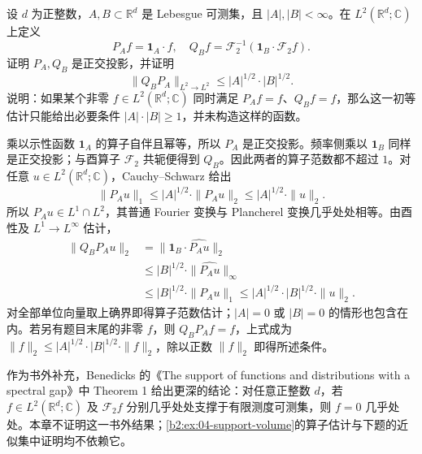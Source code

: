 \begin{exercise}\label{b2:ex:04-support-volume}
设 \(d\) 为正整数，\(A,B\subset\mathbb R^d\) 是 Lebesgue 可测集，且 \(|A|,|B|<\infty\)。在 \(L^2(\mathbb R^d;\mathbb C)\) 上定义
\[
 P_Af=\mathbf1_A\cdot f,
 \quad Q_Bf=\mathcal F_2^{-1}(\mathbf1_B\cdot\mathcal F_2f).
\]
证明 \(P_A,Q_B\) 是正交投影，并证明
\[
 \|Q_BP_A\|_{L^2\to L^2}\leq|A|^{1/2}\cdot|B|^{1/2}.
\]
说明：如果某个非零 \(f\in L^2(\mathbb R^d;\mathbb C)\) 同时满足 \(P_Af=f\)、\(Q_Bf=f\)，那么这一初等估计只能给出必要条件 \(|A|\cdot|B|\geq1\)，并未构造这样的函数。
\end{exercise}
\begin{solution}
乘以示性函数 \(\mathbf1_A\) 的算子自伴且幂等，所以 \(P_A\) 是正交投影。频率侧乘以 \(\mathbf1_B\) 同样是正交投影；与酉算子 \(\mathcal F_2\) 共轭便得到 \(Q_B\)。因此两者的算子范数都不超过 \(1\)。对任意 \(u\in L^2(\mathbb R^d;\mathbb C)\)，Cauchy--Schwarz 给出
\[
 \|P_Au\|_1\leq|A|^{1/2}\cdot\|P_Au\|_2
 \leq|A|^{1/2}\cdot\|u\|_2.
\]
所以 \(P_Au\in L^1\cap L^2\)，其普通 Fourier 变换与 Plancherel 变换几乎处处相等。由酉性及 \(L^1\to L^\infty\) 估计，
\[
 \begin{aligned}
 \|Q_BP_Au\|_2
 &=\|\mathbf1_B\cdot\widehat{P_Au}\|_2\\
 &\leq|B|^{1/2}\cdot\|\widehat{P_Au}\|_\infty\\
 &\leq|B|^{1/2}\cdot\|P_Au\|_1
 \leq|A|^{1/2}\cdot|B|^{1/2}\cdot\|u\|_2.
 \end{aligned}
\]
对全部单位向量取上确界即得算子范数估计；\(|A|=0\) 或 \(|B|=0\) 的情形也包含在内。若另有题目末尾的非零 \(f\)，则 \(Q_BP_Af=f\)，上式成为 \(\|f\|_2\leq|A|^{1/2}\cdot|B|^{1/2}\cdot\|f\|_2\)，除以正数 \(\|f\|_2\) 即得所述条件。
\end{solution}

作为书外补充，Benedicks 的《The support of functions and distributions with a spectral gap》\cite[p. 286]{Benedicks1984SpectralGap}中 Theorem 1 给出更深的结论：对任意正整数 \(d\)，若 \(f\in L^2(\mathbb R^d;\mathbb C)\) 及 \(\mathcal F_2f\) 分别几乎处处支撑于有限测度可测集，则 \(f=0\) 几乎处处。本章不证明这一书外结果；\cref{b2:ex:04-support-volume}的算子估计与下题的近似集中证明均不依赖它。

